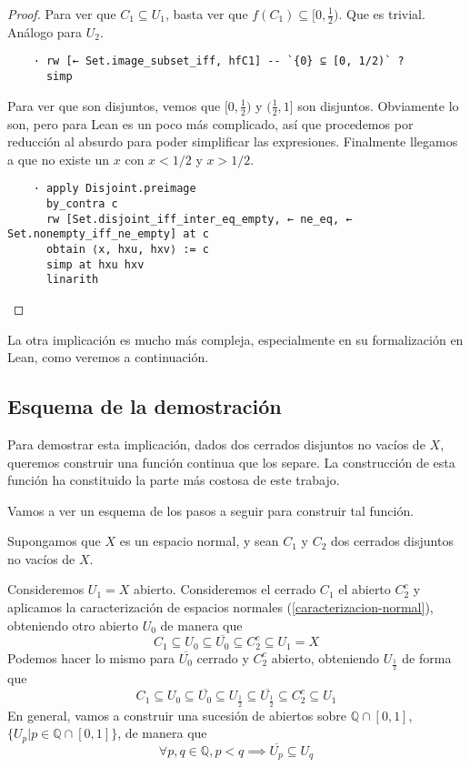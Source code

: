 \begin{proof}
  Para ver que $C_1 \subseteq U_1$, basta ver que $f(C_1) \subseteq [0, \frac{1}{2})$. Que es trivial. Análogo para $U_2$.

  \begin{lstlisting}
    · rw [← Set.image_subset_iff, hfC1] -- `{0} ⊆ [0, 1/2)` ?
      simp \end{lstlisting}

  Para ver que son disjuntos, vemos que $[0, \frac{1}{2})$ y $(\frac{1}{2}, 1]$ son disjuntos. Obviamente lo son, pero para Lean es un poco más complicado, así que procedemos por reducción al absurdo para poder simplificar las expresiones. Finalmente llegamos a que no existe un $x$ con $x < 1/2$ y $x > 1/2$.

  \begin{lstlisting}
    · apply Disjoint.preimage
      by_contra c
      rw [Set.disjoint_iff_inter_eq_empty, ← ne_eq, ← Set.nonempty_iff_ne_empty] at c
      obtain ⟨x, hxu, hxv⟩ := c
      simp at hxu hxv
      linarith \end{lstlisting}
\end{proof}


La otra implicación es mucho más compleja, especialmente en su formalización en Lean, como veremos a continuación.


\subsection{Esquema de la demostración}

Para demostrar esta implicación, dados dos cerrados disjuntos no vacíos de $X$, queremos construir una función continua que los separe. La construcción de esta función ha constituido la parte más costosa de este trabajo.

Vamos a ver un esquema de los pasos a seguir para construir tal función.

Supongamos que $X$ es un espacio normal, y sean $C_1$ y $C_2$ dos cerrados disjuntos no vacíos de $X$.

Consideremos $U_1 = X$ abierto. Consideremos el cerrado $C_1$ el abierto $C_2^c$ y aplicamos la caracterización de espacios normales (\ref{caracterizacion-normal}), obteniendo otro abierto $U_0$ de manera que
$$
C_1 \subseteq U_0 \subseteq \overline{U_0} \subseteq C_2^c \subseteq U_1 = X
$$
Podemos hacer lo mismo para $\overline{U_0}$ cerrado y $C_2^c$ abierto, obteniendo $U_{\frac{1}{2}}$ de forma que
$$
C_1 \subseteq U_0 \subseteq \overline{U_0} \subseteq U_{\frac{1}{2}} \subseteq \overline{U_{\frac{1}{2}}} \subseteq C_2^c \subseteq U_1
$$
En general, vamos a construir una sucesión de abiertos sobre $\mathbb{Q}\cap[0, 1]$, $\{U_p | p \in \mathbb{Q}\cap[0, 1]\}$, de manera que
\begin{equation}
  \forall p , q \in \mathbb{Q}, p < q \implies \overline{U_p} \subseteq U_q \tag{$\star$} \label{eq:star}
\end{equation}

